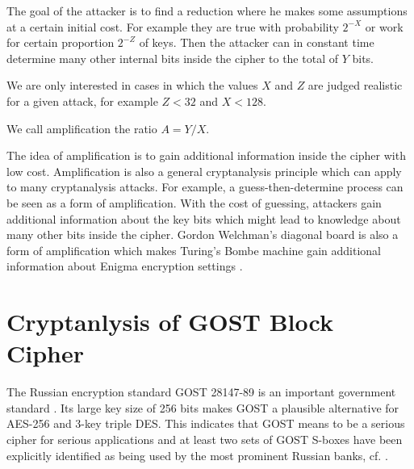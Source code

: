 \begin{mydef}
	The goal of the attacker
	is to find a reduction where he makes some assumptions
	at a certain initial cost.
	For example they are true with probability $2^{-X}$
	or work for certain proportion $2^{-Z}$ of keys.
	Then the attacker can in constant time determine
	many other internal bits inside the cipher to the total of $Y$ bits.
	
	We are only interested in cases in which the values
	$X$ and $Z$ are judged realistic for a given attack,
	for example $Z<32$ and $X<128$.
	
	We call amplification the ratio $A=Y/X$.
\end{mydef}

The idea of amplification is to gain additional information inside the cipher with low cost. Amplification is also a general cryptanalysis principle which can apply to many cryptanalysis attacks. For example, a guess-then-determine process can be seen as a form of amplification. With the cost of guessing, attackers gain additional information about the key bits which might lead to knowledge about many other bits inside the cipher. 
Gordon Welchman's diagonal board is also a form of amplification which makes Turing's Bombe machine gain additional information about Enigma encryption settings \cite{CourtoisBlockEnigmaSlides}. 




\section{Cryptanlysis of GOST Block Cipher} \label{sec:introductionToGOST}
The Russian encryption standard
GOST 28147-89 %
is an important government standard
\cite{gost198928147}.
Its large key size of 256 bits makes GOST a plausible alternative for AES-256 and 3-key triple DES.
This indicates that GOST means to be a serious cipher for serious applications
and at least two sets of GOST S-boxes have been explicitly identified as being used by the most prominent Russian banks, %
cf. \cite{schneier2007applied,GOSTRussianReferenceImplementation}.

